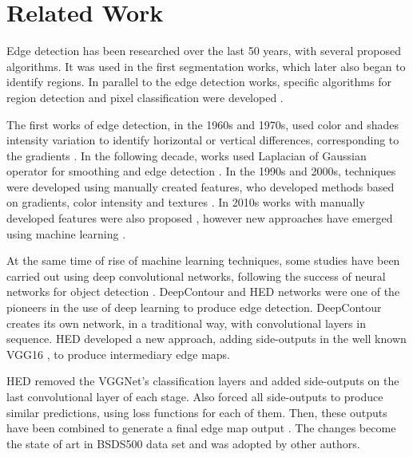 \section{Related Work}
\label{cap4_trab_rel}

Edge detection has been researched over the last 50 years, with several proposed algorithms. 
It was used in the first segmentation works, which later also began to identify regions.
In parallel to the edge detection works, specific algorithms for region detection and pixel classification were developed \cite{RCF:2017:8100105, pedrini2008analise}.

The first works of edge detection, in the 1960s and 1970s, used color and shades intensity variation to identify horizontal or vertical differences, corresponding to the gradients \cite{Roberts:1963, KIRSCH1971315, ROBINSON1977492, FREI_CHEN:1674733}.
In the following decade, works used Laplacian of Gaussian operator for smoothing and edge detection \cite{BERZINS1984195, Canny:1986, HUERTAS_MEDIONI:4767838}.
In the 1990s and 2000s, techniques were developed using manually created features, who developed methods based on gradients, color intensity and textures \cite{KONISHI:1159946, MARTIN:1273918}.
In 2010s works with manually developed features were also proposed \cite{LIM:6619250}, however new approaches have emerged using machine learning \cite{StructuredEdges:2015}.

At the same time of rise of machine learning techniques, some studies have been carried out using deep convolutional networks, following the success of neural networks for object detection \cite{Segnet:2017:7803544}.
DeepContour \cite{DeepContour:2015:7299024} and HED \cite{Xie:2017:HED:3158436.3158453} networks were one of the pioneers in the use of deep learning to produce edge detection.
DeepContour creates its own network, in a traditional way, with convolutional layers in sequence.
HED developed a new approach, adding side-outputs in the well known VGG16 \cite{VGGNET:2014}, to produce intermediary edge maps.

HED removed the VGGNet's classification layers and added side-outputs on the last convolutional layer of each stage.
Also forced all side-outputs to produce similar predictions, using loss functions for each of them.
Then, these outputs have been combined to generate a final edge map output \cite{Xie:2017:HED:3158436.3158453}.
The changes become the state of art in BSDS500 data set \cite{amfm_pami2011} and was adopted by other authors.

